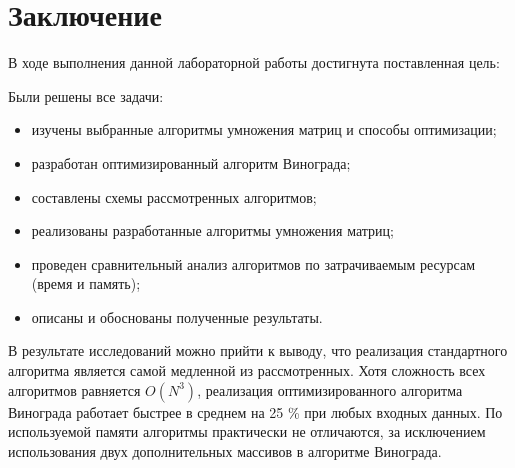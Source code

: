\chapter*{Заключение}


В ходе выполнения данной лабораторной работы достигнута поставленная цель:

Были решены все задачи:
\begin{itemize}
	\item изучены выбранные алгоритмы умножения матриц и способы оптимизации;
	\item разработан оптимизированный алгоритм Винограда;
	\item составлены схемы рассмотренных алгоритмов;
	\item реализованы разработанные алгоритмы умножения матриц;
	\item проведен сравнительный анализ алгоритмов по затрачиваемым ресурсам (время и память);
	\item описаны и обоснованы полученные результаты.
\end{itemize}

В результате исследований можно прийти к выводу, что реализация стандартного алгоритма является самой медленной из рассмотренных. Хотя сложность всех алгоритмов равняется $O(N^3)$, реализация оптимизированного алгоритма Винограда работает быстрее в среднем на 25 \% при любых входных данных. По используемой памяти алгоритмы практически не отличаются, за исключением использования двух дополнительных массивов в алгоритме Винограда.


